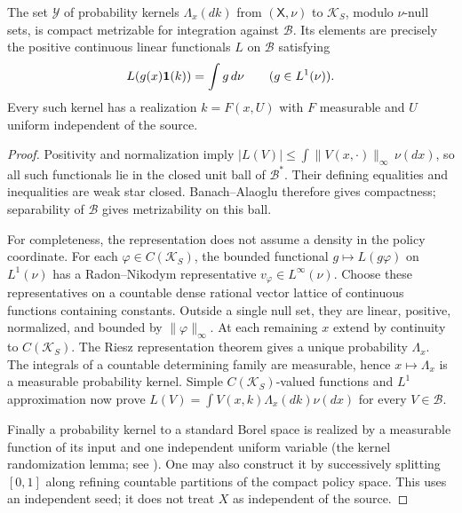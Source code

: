 \begin{lemma}
\label{lem:v11-young}
The set $\mathcal Y$ of probability kernels
$\Lambda_x(dk)$ from $(\mathsf X,\nu)$ to $\mathcal K_S$, modulo
$\nu$-null sets, is compact metrizable for integration against
$\mathcal B$. Its elements are precisely the positive continuous linear
functionals $L$ on $\mathcal B$ satisfying
\[
 L(g(x)\mathbf 1(k))=\int g\,d\nu\qquad(g\in L^1(\nu)).
\]
Every such kernel has a realization $k=F(x,U)$ with $F$ measurable and
$U$ uniform independent of the source.
\end{lemma}

\begin{proof}
Positivity and normalization imply
$|L(V)|\le\int\|V(x,\cdot)\|_\infty\,\nu(dx)$, so all such functionals
lie in the closed unit ball of $\mathcal B^*$. Their defining equalities
and inequalities are weak star closed. Banach--Alaoglu therefore gives
compactness; separability of $\mathcal B$ gives metrizability on this ball.

For completeness, the representation does not assume a density in the
policy coordinate. For each $\varphi\in C(\mathcal K_S)$, the bounded
functional $g\mapsto L(g\varphi)$ on $L^1(\nu)$ has a Radon--Nikodym
representative $v_\varphi\in L^\infty(\nu)$. Choose these representatives
on a countable dense rational vector lattice of continuous functions
containing constants. Outside a single null set, they are linear,
positive, normalized, and bounded by $\|\varphi\|_\infty$. At each
remaining $x$ extend by continuity to $C(\mathcal K_S)$. The Riesz
representation theorem gives a unique probability $\Lambda_x$.
The integrals of a countable determining family are measurable, hence
$x\mapsto\Lambda_x$ is a measurable probability kernel. Simple
$C(\mathcal K_S)$-valued functions and $L^1$ approximation now prove
$L(V)=\int V(x,k)\Lambda_x(dk)\nu(dx)$ for every $V\in\mathcal B$.

Finally a probability kernel to a standard Borel space is realized by a
measurable function of its input and one independent uniform variable
(the kernel randomization lemma; see \cite{Kallenberg2021}). One may also
construct it by successively splitting $[0,1]$ along refining countable
partitions of the compact policy space. This uses an independent seed;
it does not treat $X$ as independent of the source.
\end{proof}

